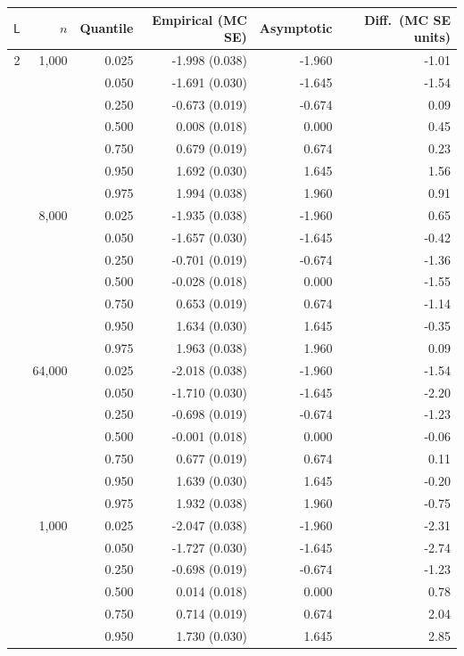 \begin{tabular}{rrrrrr}
\toprule
$\mathsf L$ & $n$ & Quantile & Empirical (MC SE) & Asymptotic & Diff.\ (MC SE units) \\
\midrule
2 & 1,000 & 0.025 & -1.998 (0.038) & -1.960 & -1.01 \\
 &  & 0.050 & -1.691 (0.030) & -1.645 & -1.54 \\
 &  & 0.250 & -0.673 (0.019) & -0.674 & 0.09 \\
 &  & 0.500 & 0.008 (0.018) & 0.000 & 0.45 \\
 &  & 0.750 & 0.679 (0.019) & 0.674 & 0.23 \\
 &  & 0.950 & 1.692 (0.030) & 1.645 & 1.56 \\
 &  & 0.975 & 1.994 (0.038) & 1.960 & 0.91 \\
\addlinespace
2 & 8,000 & 0.025 & -1.935 (0.038) & -1.960 & 0.65 \\
 &  & 0.050 & -1.657 (0.030) & -1.645 & -0.42 \\
 &  & 0.250 & -0.701 (0.019) & -0.674 & -1.36 \\
 &  & 0.500 & -0.028 (0.018) & 0.000 & -1.55 \\
 &  & 0.750 & 0.653 (0.019) & 0.674 & -1.14 \\
 &  & 0.950 & 1.634 (0.030) & 1.645 & -0.35 \\
 &  & 0.975 & 1.963 (0.038) & 1.960 & 0.09 \\
\addlinespace
2 & 64,000 & 0.025 & -2.018 (0.038) & -1.960 & -1.54 \\
 &  & 0.050 & -1.710 (0.030) & -1.645 & -2.20 \\
 &  & 0.250 & -0.698 (0.019) & -0.674 & -1.23 \\
 &  & 0.500 & -0.001 (0.018) & 0.000 & -0.06 \\
 &  & 0.750 & 0.677 (0.019) & 0.674 & 0.11 \\
 &  & 0.950 & 1.639 (0.030) & 1.645 & -0.20 \\
 &  & 0.975 & 1.932 (0.038) & 1.960 & -0.75 \\
\addlinespace
4 & 1,000 & 0.025 & -2.047 (0.038) & -1.960 & -2.31 \\
 &  & 0.050 & -1.727 (0.030) & -1.645 & -2.74 \\
 &  & 0.250 & -0.698 (0.019) & -0.674 & -1.23 \\
 &  & 0.500 & 0.014 (0.018) & 0.000 & 0.78 \\
 &  & 0.750 & 0.714 (0.019) & 0.674 & 2.04 \\
 &  & 0.950 & 1.730 (0.030) & 1.645 & 2.85 \\

\end{tabular}
